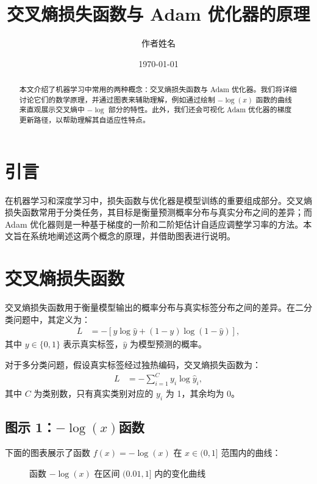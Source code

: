 \documentclass[11pt]{ctexart} %
\title{交叉熵损失函数与 Adam 优化器的原理}
\author{作者姓名}
\date{\today}
\begin{document}
\maketitle

\begin{abstract}
本文介绍了机器学习中常用的两种概念：交叉熵损失函数与 Adam 优化器。我们将详细讨论它们的数学原理，并通过图表来辅助理解，例如通过绘制 $-\log(x)$ 函数的曲线来直观展示交叉熵中 \(-\log\) 部分的特性。此外，我们还会可视化 Adam 优化器的梯度更新路径，以帮助理解其自适应性特点。
\end{abstract}

\section{引言}
在机器学习和深度学习中，损失函数与优化器是模型训练的重要组成部分。交叉熵损失函数常用于分类任务，其目标是衡量预测概率分布与真实分布之间的差异；而 Adam 优化器则是一种基于梯度的一阶和二阶矩估计自适应调整学习率的方法。本文旨在系统地阐述这两个概念的原理，并借助图表进行说明。

\section{交叉熵损失函数}
交叉熵损失函数用于衡量模型输出的概率分布与真实标签分布之间的差异。在二分类问题中，其定义为：
\begin{align}
L &= - \left[ y \log \hat{y} + (1-y) \log (1-\hat{y}) \right],
\end{align}
其中 \(y\in\{0,1\}\) 表示真实标签，\(\hat{y}\) 为模型预测的概率。

对于多分类问题，假设真实标签经过独热编码，交叉熵损失函数为：
\begin{align}
L &= - \sum_{i=1}^{C} y_i \log \hat{y}_i,
\end{align}
其中 \(C\) 为类别数，只有真实类别对应的 \(y_i\) 为 1，其余均为 0。

\subsection{图示 1：\texorpdfstring{$-\log(x)$}{-log(x)}函数}
下面的图表展示了函数 \(f(x) = -\log(x)\) 在 \(x\in (0,1]\) 范围内的曲线：
\begin{figure}[h]
\centering
{}
\caption{函数 $-\log(x)$ 在区间 $(0.01,1]$ 内的变化曲线}
\end{figure}
\end{document}
